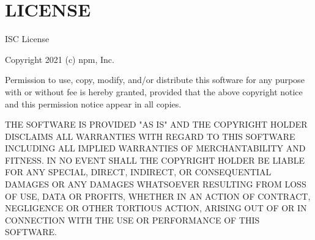 \chapter{LICENSE}
\hypertarget{md__2_users_2hello_2_documents_2_git_hub_2finalproject-engine-drop-table-engines_2_engine_2src_24a9eaa9fd0a1cbe74af7ded0b1c8e992}{}\label{md__2_users_2hello_2_documents_2_git_hub_2finalproject-engine-drop-table-engines_2_engine_2src_24a9eaa9fd0a1cbe74af7ded0b1c8e992}
ISC License

Copyright 2021 (c) npm, Inc.

Permission to use, copy, modify, and/or distribute this software for any purpose with or without fee is hereby granted, provided that the above copyright notice and this permission notice appear in all copies.

THE SOFTWARE IS PROVIDED "{}\+AS IS"{} AND THE COPYRIGHT HOLDER DISCLAIMS ALL WARRANTIES WITH REGARD TO THIS SOFTWARE INCLUDING ALL IMPLIED WARRANTIES OF MERCHANTABILITY AND FITNESS. IN NO EVENT SHALL THE COPYRIGHT HOLDER BE LIABLE FOR ANY SPECIAL, DIRECT, INDIRECT, OR CONSEQUENTIAL DAMAGES OR ANY DAMAGES WHATSOEVER RESULTING FROM LOSS OF USE, DATA OR PROFITS, WHETHER IN AN ACTION OF CONTRACT, NEGLIGENCE OR OTHER TORTIOUS ACTION, ARISING OUT OF OR IN CONNECTION WITH THE USE OR PERFORMANCE OF THIS SOFTWARE. 